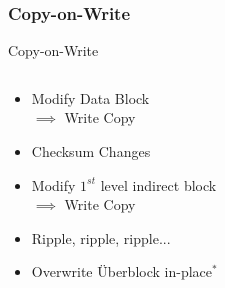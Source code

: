 \subsubsection{Copy-on-Write}
\begin{frame}{Copy-on-Write}
\begin{columns}
	\begin{column}{0.4\textwidth}
			\begin{itemize}
				\item<2-> Modify Data Block \\ $\implies$ Write Copy
				\item<3-> Checksum Changes
				\item<4-> Modify $1^{st}$ level indirect block \\ $\implies$ Write Copy
				\item<5-> Ripple, ripple, ripple...
				\item<6-> Overwrite \alert{Überblock} in-place$^*$
			\end{itemize}
	\end{column}
	\begin{column}{0.6\textwidth}
		\begin{figure}
		\centering

\end{figure}
\end{column}
\end{columns}
\end{frame}
